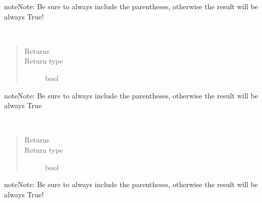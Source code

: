 \documentclass[letterpaper,10pt,english]{sphinxmanual}
\begin{document}
\begin{fulllineitems}
\begin{fulllineitems}
\begin{sphinxadmonition}{note}{Note:}
Be sure to always include the parentheses, otherwise the result will be always True!
\end{sphinxadmonition}

\end{fulllineitems}


\begin{fulllineitems}
\label{\detokenize{Reference:salabim.Component.isinterrupted}}~\begin{quote}\begin{description}
\item[{Returns}] \leavevmode
{}

\item[{Return type}] \leavevmode
bool

\end{description}\end{quote}

\begin{sphinxadmonition}{note}{Note:}
Be sure to always include the parentheses, otherwise the result will be always True
\end{sphinxadmonition}

\end{fulllineitems}


\begin{fulllineitems}
\label{\detokenize{Reference:salabim.Component.ispassive}}~\begin{quote}\begin{description}
\item[{Returns}] \leavevmode
{}

\item[{Return type}] \leavevmode
bool

\end{description}\end{quote}

\begin{sphinxadmonition}{note}{Note:}
Be sure to always include the parentheses, otherwise the result will be always True!
\end{sphinxadmonition}


\end{fulllineitems}
\end{fulllineitems}
\end{document}
